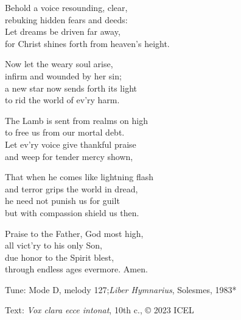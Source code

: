 \hymn

\settowidth{\versewidth}{for Christ shines forth from heaven’s height.}

\begin{hymnverse}[\versewidth]
Behold a voice resounding, clear,\\
rebuking hidden fears and deeds:\\
Let dreams be driven far away,\\
for Christ shines forth from heaven’s height.

Now let the weary soul arise,\\
infirm and wounded by her sin;\\
a new star now sends forth its light\\
to rid the world of ev’ry harm.

The Lamb is sent from realms on high\\
to free us from our mortal debt.\\
Let ev’ry voice give thankful praise\\
and weep for tender mercy shown,

That when he comes like lightning flash\\
and terror grips the world in dread,\\
he need not punish us for guilt\\
but with compassion shield us then.

Praise to the Father, God most high,\\
all vict’ry to his only Son,\\
due honor to the Spirit blest,\\
through endless ages evermore. Amen.
\end{hymnverse}

\begin{hymnsource}
Tune: Mode D, melody 127;\emph{Liber Hymnarius}, Solesmes, 1983*

Text: \emph{Vox clara ecce intonat}, 10th c., © 2023 ICEL
\end{hymnsource}